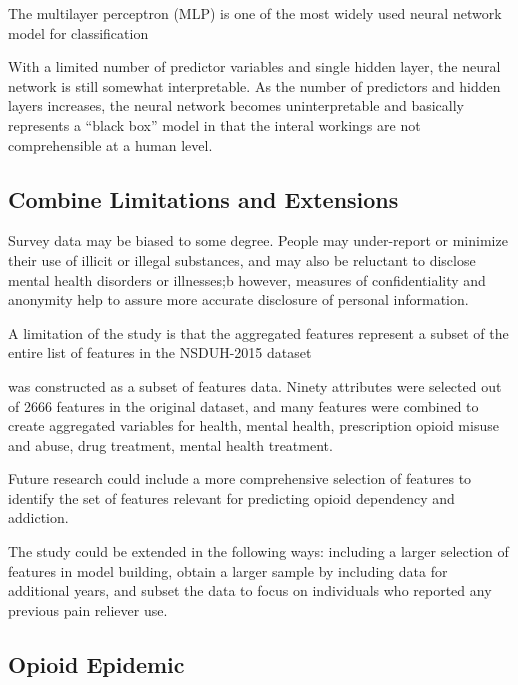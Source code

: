 \documentclass[sigconf]{acmart}
\begin{document}
The multilayer perceptron (MLP) is one of the most widely used neural network 
model for classification 

With a limited number of predictor variables and single 
hidden layer, the neural network is still somewhat interpretable. As the 
number of predictors and hidden layers increases, the neural network becomes 
uninterpretable and basically represents a ``black box'' model in that 
the interal workings are not comprehensible at a human level. 



\subsection{Combine Limitations and Extensions}

Survey data may be biased to some degree. People may under-report or minimize 
their use of illicit or illegal substances, and may also be reluctant to 
disclose mental health disorders or illnesses;b however, measures of 
confidentiality and anonymity help to assure more accurate disclosure 
of personal information. 

A limitation of the study is that the aggregated features represent a subset
of the entire list of features in the NSDUH-2015 dataset 


was constructed as a subset of 
features data. 
Ninety attributes were selected out of 2666 features in the original dataset, 
and many features were combined to create aggregated variables for health, 
mental health, prescription opioid misuse and abuse, drug treatment, mental health
treatment. 

Future research could include a more comprehensive selection of
features to identify the set of features relevant for predicting opioid
dependency and addiction. 

The study could be extended in the following ways: including a larger
selection of features in model building, obtain a larger sample by including 
data for additional years, and subset the data to focus on individuals who 
reported any previous pain reliever use. 



\subsection{Opioid Epidemic}
\end{document}
